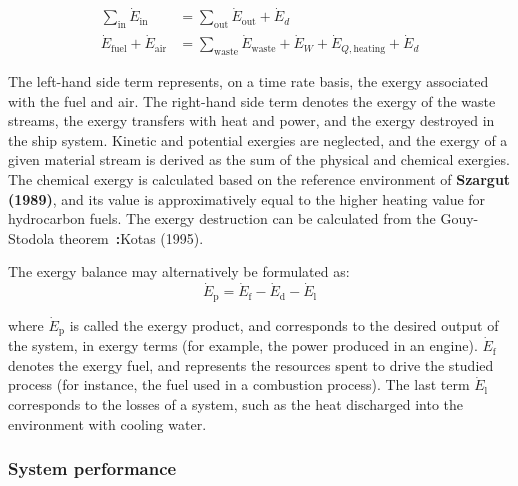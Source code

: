 \documentclass[preprint,12pt]{elsarticle}
\begin{document}
\begin{align}
	\sum_{\mathrm{in}} \dot{E}_{\mathrm{in}} &= \sum_{\mathrm{out}} \dot{E}_{\mathrm{out}} +\dot{E}_{d} \\
	\dot{E}_{\mathrm{fuel}} + \dot{E}_{\mathrm{air}} &= \sum_{{\mathrm{waste}}}\dot{E}_{{\mathrm{waste}}}+\dot{E}_{W}+\dot{E}_{Q,\mathrm{heating}}+\dot{E}_{d} 
\end{align}

The left-hand side term represents, on a time rate basis, the exergy associated with the fuel and air. The right-hand side term denotes the exergy of the waste streams, the exergy transfers with heat and power, and the exergy destroyed in the ship system. Kinetic and potential exergies are neglected, and the exergy of a given material stream is derived as the sum of the physical and chemical exergies. The chemical exergy is calculated based on the reference environment of \textbf{Szargut (1989)}, and its value is approximatively equal to the higher heating value for hydrocarbon fuels. The exergy destruction can be calculated from the Gouy-Stodola theorem~\textbf:{Kotas (1995)}.    

The exergy balance may alternatively be formulated as:
\begin{equation}
\dot{E}_{\mathrm{p}} = \dot{E}_{\mathrm{f}} - \dot{E}_{\mathrm{d}} - \dot{E}_{\mathrm{l}} 
\end{equation}

where $\dot{E}_{\mathrm{p}}$ is called the exergy product, and corresponds to the desired output of the system, in exergy terms (for example, the power produced in an engine). $\dot{E}_{\mathrm{f}}$ denotes the exergy fuel, and represents the resources spent to drive the studied process (for instance, the fuel used in a combustion process). The last term $\dot{E}_{\mathrm{l}}$ corresponds to the losses of a system, such as the heat discharged into the environment with cooling water. 

\subsubsection{System performance}
\end{document}
